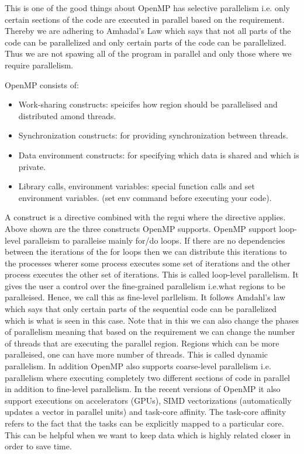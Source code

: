 \documentclass[12pt]{article}
\begin{document}
This is one of the good things about OpenMP has selective parallelism i.e. only certain sections of the code are executed in parallel based on the requirement. Thereby we are adhering to Amhadal's Law which says that not all parts of the code can be parallelized
and only certain parts of the code can be parallelized. Thus we are not spawing all of the program in parallel and only those where we require parallelism.

OpenMP consists of:
\begin{itemize}
\item Work-sharing constructs: speicifes how region should be parallelised and distributed amond threads.
\item Synchronization constructs: for providing synchronization between threads.
\item Data environment constructs: for specifying which data is shared and which is private.
\item Library calls, environment variables: special function calls and set environment variables. (set env command before executing your code).
\end{itemize}
A construct is a directive combined with the regui where the directive applies. Above shown are the three constructs OpenMP supports.
OpenMP support loop-level paralleism to paralleise mainly for/do loops. If there are no dependencies between the iterations of the for loops then we can distribute this iterations to the processes
wherer some process executes some set of iterations and the other process executes the other set of iterations. This is called loop-level parallelism.
It gives the user a control over the fine-grained parallelism i.e.what regions to be paralleised. Hence, we call this as fine-level parllelism.
It follows Amdahl's law which says that only certain parts of the sequential code can be parallelized which is what is seen in this case. Note that in this we can also change the phases of parallelism meaning that 
based on the requirement we can change the number of threads that are executing the parallel region. Regions which can be more paralleised, one can have more number of threads. This is called dynamic parallelism.
In addition OpenMP also supports coarse-level parallelism i.e. parallelism where executing completely two different sections of code in parallel in addition to fine-level parallelism.
In the recent versions of OpenMP it also support executions on accelerators (GPUs), SIMD vectorizations (automatically updates a vector in parallel units) and task-core affinity.
The task-core affinity refers to the fact that the tasks can be explicitly mapped to a particular core. This can be helpful when we want to keep data which is highly related closer in order to save time.
\end{document}

